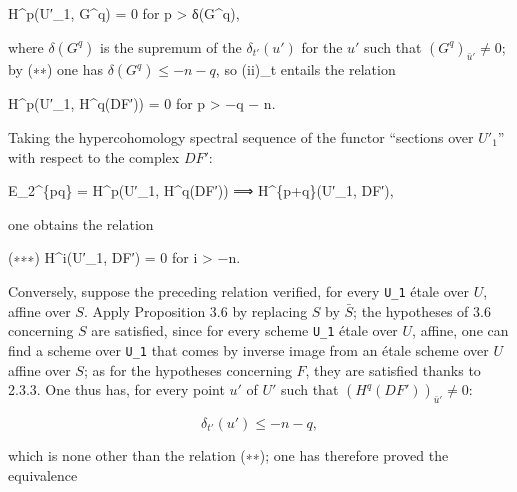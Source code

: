 \documentclass[
  11pt,
  a4paper,
]{book}
\newenvironment{Shaded}{}{}
\newcommand{\NormalTok}[1]{#1}
\newcounter{none} %
\begin{document}
\begin{Shaded}
\begin{Highlighting}[]
\NormalTok{H\^{}p(U′\_1, G\^{}q) = 0 for p \textgreater{} δ(G\^{}q),}
\end{Highlighting}
\end{Shaded}

where \(\delta(G^{q})\) is the supremum of the \(\delta_{t'}(u')\) for
the \(u'\) such that \((G^{q})_{\bar{u}'} \neq 0\); by (∗∗) one has
\(\delta(G^{q}) \leqslant -n - q\), so (ii)\_t entails the relation

\begin{Shaded}
\begin{Highlighting}[]
\NormalTok{H\^{}p(U′\_1, H\^{}q(DF′)) = 0 for p \textgreater{} −q − n.}
\end{Highlighting}
\end{Shaded}

Taking the hypercohomology spectral sequence of the functor ``sections
over \(U'_{1}\)'' with respect to the complex \(DF'\):

\begin{Shaded}
\begin{Highlighting}[]
\NormalTok{E\_2\^{}\{pq\} = H\^{}p(U′\_1, H\^{}q(DF′)) ⟹ H\^{}\{p+q\}(U′\_1, DF′),}
\end{Highlighting}
\end{Shaded}

one obtains the relation

\begin{Shaded}
\begin{Highlighting}[]
\NormalTok{(∗∗∗) H\^{}i(U′\_1, DF′) = 0 for i \textgreater{} −n.}
\end{Highlighting}
\end{Shaded}

Conversely, suppose the preceding relation verified, for every
\texttt{U\_1} étale over \(U\), affine over \(S\). Apply Proposition 3.6
by replacing \(S\) by \(\bar{S}\); the hypotheses of 3.6 concerning
\(S\) are satisfied, since for every scheme \texttt{U\_1} étale over
\(U\), affine, one can find a scheme over \texttt{U\_1} that comes by
inverse image from an étale scheme over \(U\) affine over \(S\); as for
the hypotheses concerning \(F\), they are satisfied thanks to 2.3.3. One
thus has, for every point \(u'\) of \(U'\) such that
\((H^{q}(DF'))_{\bar{u}'} \neq 0\):

\[ \delta_{t'}(u') \leqslant -n - q, \]

which is none other than the relation (∗∗); one has therefore proved the
equivalence
\end{document}
